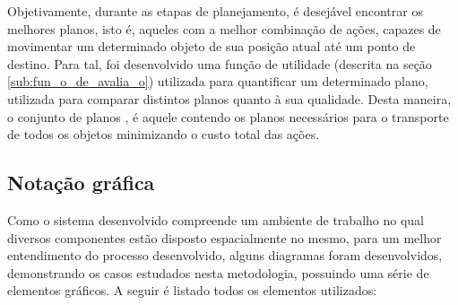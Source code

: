 Objetivamente, durante as etapas de planejamento, é desejável encontrar os melhores planos, isto é, aqueles com a melhor combinação de ações, capazes de movimentar um determinado objeto de sua posição atual até um ponto de destino.
Para tal, foi desenvolvido uma função de utilidade (descrita na seção \ref{sub:fun_o_de_avalia_o}) utilizada para quantificar um determinado plano, utilizada para comparar distintos planos quanto à sua qualidade.
Desta maneira, o conjunto de planos , é aquele contendo os planos necessários para o transporte de todos os objetos minimizando o custo total das ações.

\subsection{Notação gráfica} %
\label{sub:nota_o_gr_fica}

Como o sistema desenvolvido compreende um ambiente de trabalho no qual diversos componentes estão disposto espacialmente no mesmo, para um melhor entendimento do processo desenvolvido, alguns diagramas foram desenvolvidos, demonstrando os casos estudados nesta metodologia, possuindo uma série de elementos gráficos.
A seguir é listado todos os elementos utilizados:

